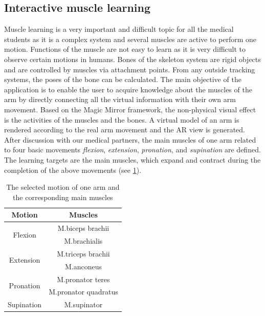 \subsection{Interactive muscle learning}
Muscle learning is a very important and difficult topic for all the medical students as it is a complex system and several muscles are active to perform one motion.
Functions of the muscle are not easy to learn as it is very difficult to observe certain motions in humans.
Bones of the skeleton system are rigid objects and are controlled by muscles via attachment points. From any outside tracking systems, the poses of the bone can be calculated.
The main objective of the application is to enable the user to acquire knowledge about the muscles of the arm %
by directly connecting all the virtual information with their own arm movement. 
Based on the Magic Mirror framework, the non-physical visual effect is the activities of the muscles and the bones. A virtual model of an arm is rendered according to the real arm movement and the AR view is generated.
After discussion with our medical partners, the main muscles of one arm related to four basic movements \textit{flexion}, \textit{extension}, \textit{pronation}, and \textit{supination} are defined. The learning targets are the main muscles, which expand and contract during the completion of the above movements (see \tablename{\ref{tb:3-IMR:motionMuscles}}). 
\begin{table}
	\caption[Muscles involved]{The selected motion of one arm and the corresponding main muscles}
	\centering
	\label{tb:3-IMR:motionMuscles}
	\scriptsize
	\begin{center}
		\begin{tabular}{|c|c|}
			\hline
			Motion & Muscles \\
			\hline
			\multirow{2}{*}{Flexion} & M.biceps brachii \\
			& M.brachialis \\
			\hline
			\multirow{2}{*}{Extension} & M.triceps brachii \\
			& M.anconeus \\
			\hline
			\multirow{2}{*}{Pronation} & M.pronator teres \\
			& M.pronator quadratus \\
			\hline
			Supination &M.supinator \\
			\hline
		\end{tabular}
	\end{center}
\end{table}

